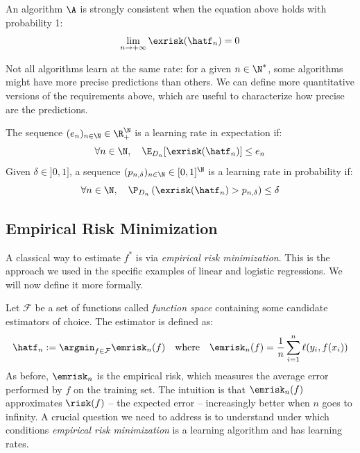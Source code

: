 \documentclass{../cs-classes/cs-classes}
\begin{document}
\begin{definition}
    An algorithm $\A$ is strongly consistent when the equation above holds with probability 1:
    \begin{equation*}
        \lim_{n\to+\infty}\exrisk(\hatf_n)=0
    \end{equation*}
\end{definition}

Not all algorithms learn at the same rate: for a given $n\in\N^*$, some algorithms might have more precise predictions than others. We can define more quantitative versions of the requirements above, which are useful to characterize how precise are the predictions.
\begin{definition}
    The sequence $(e_n)_{n\in\N}\in\R_+^\N$ is a learning rate in expectation if:
    \begin{equation*}
        \forall n\in\N, \quad \E_{D_n}[\exrisk(\hatf_n)]\leq e_n
    \end{equation*}
    Given $\delta\in]0, 1]$, a sequence $(p_{n,\delta})_{n\in\N}\in[0, 1]^\N$ is a learning rate in probability if:
    \begin{equation*}
        \forall n\in\N, \quad \P_{D_n}\left(\exrisk(\hatf_n)>p_{n,\delta}\right)\leq\delta
    \end{equation*}
\end{definition}

\subsection{Empirical Risk Minimization}
A classical way to estimate $f^*$ is via \emph{empirical risk minimization}. This is the approach we used in the specific examples of linear and logistic regressions. We will now define it more formally.

Let $\mathcal{F}$ be a set of functions called \emph{function space} containing some candidate estimators of choice. The estimator is defined as:
\begin{equation*}
    \hatf_n := \argmin_{f\in\mathcal{F}} \emrisk_n(f) \quad \textnormal{where}\quad \emrisk_n(f) = \frac{1}{n}\sum_{i=1}^n\ell(y_i, f(x_i))
\end{equation*}
As before, $\emrisk_n$ is the empirical risk, which measures the average error performed by $f$ on the training set. The intuition is that $\emrisk_n(f)$ approximates $\risk(f)$ -- the expected error -- increasingly better when $n$ goes to infinity. A crucial question we need to address is to understand under which conditions \emph{empirical risk minimization} is a learning algorithm and has learning rates.
\end{document}
